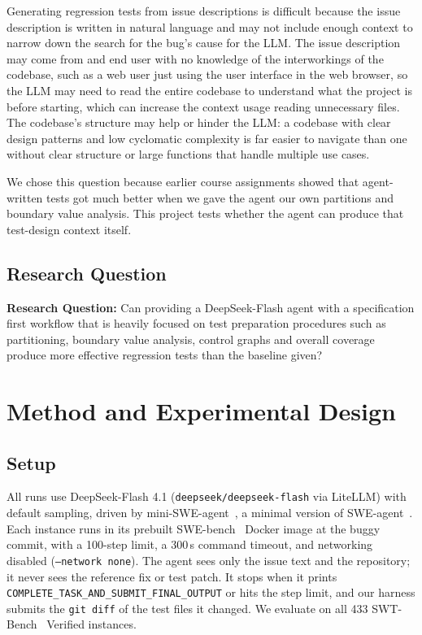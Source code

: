 \documentclass[conference]{IEEEtran}
\begin{document}
Generating regression tests from issue descriptions is difficult because the issue description is written in natural language and may not include enough context to narrow down the search for the bug's cause for the LLM. The issue description may come from and end user with no knowledge of the interworkings of the codebase, such as a web user just using the user interface in the web browser, so the LLM may need to read the entire codebase to understand what the project is before starting, which can increase the context usage reading unnecessary files. The codebase's structure may help or hinder the LLM: a codebase with clear design patterns and low cyclomatic complexity is far easier to navigate than one without clear structure or large functions that handle multiple use cases.

We chose this question because earlier course assignments showed that agent-written tests got much better when we gave the agent our own partitions and boundary value analysis. This project tests whether the agent can produce that test-design context itself.

\subsection{Research Question}
\textbf{Research Question:} Can providing a DeepSeek-Flash agent with a specification first workflow that is heavily focused on test preparation procedures such as partitioning, boundary value analysis, control graphs and overall coverage produce more effective regression tests than the baseline given?

\section{Method and Experimental Design}
\label{sec:method}

\subsection{Setup}
All runs use DeepSeek-Flash 4.1 (\texttt{deepseek/deepseek-flash} via LiteLLM) with default sampling, driven by mini-SWE-agent~\cite{minisweagent}, a minimal version of SWE-agent~\cite{sweagent}. Each instance runs in its prebuilt SWE-bench~\cite{swebench} Docker image at the buggy commit, with a 100-step limit, a 300\,s command timeout, and networking disabled (\texttt{--network none}). The agent sees only the issue text and the repository; it never sees the reference fix or test patch. It stops when it prints \texttt{COMPLETE\_TASK\_AND\_SUBMIT\_FINAL\_OUTPUT} or hits the step limit, and our harness submits the \texttt{git diff} of the test files it changed. We evaluate on all 433 SWT-Bench~\cite{swtbench} Verified instances.
\end{document}
